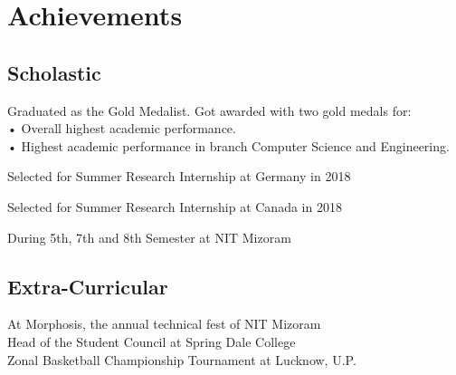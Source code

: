
\section{Achievements} 
\subsection{Scholastic}
Graduated as the Gold Medalist. Got awarded with two gold medals for:\\
• Overall highest academic performance.\\
• Highest academic performance in branch Computer Science and Engineering.

Selected for Summer Research Internship at Germany in 2018

Selected for Summer Research Internship at Canada in 2018

During 5th, 7th and 8th Semester at NIT Mizoram \vspace{\topsep}
\sectionsep

\subsection{Extra-Curricular}
At Morphosis, the annual technical fest of NIT Mizoram \\
Head of the Student Council at Spring Dale College \\
Zonal Basketball Championship Tournament at Lucknow, U.P. \\
\sectionsep